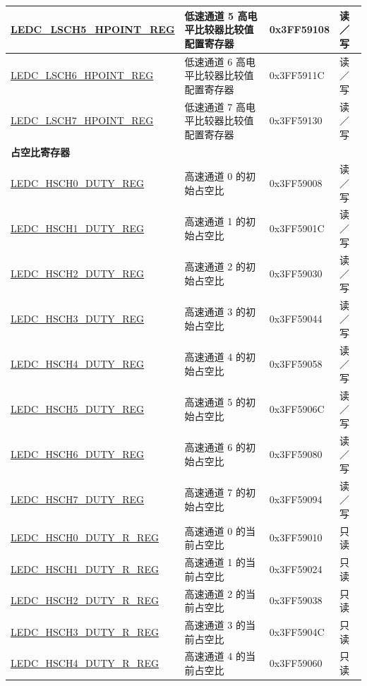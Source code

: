 \begin{longtable}{ | p{5cm} | p{7cm} | p{2.2cm} | p{1.2cm} | }
\hyperref[regdesc:LEDCLSCHnHPOINTREG]{LEDC\_LSCH5\_HPOINT\_REG} & 低速通道 5 高电平比较器比较值配置寄存器 & 0x3FF59108 & 读／写\\ \hline
\hyperref[regdesc:LEDCLSCHnHPOINTREG]{LEDC\_LSCH6\_HPOINT\_REG} & 低速通道 6 高电平比较器比较值配置寄存器 & 0x3FF5911C & 读／写\\ \hline
\hyperref[regdesc:LEDCLSCHnHPOINTREG]{LEDC\_LSCH7\_HPOINT\_REG} & 低速通道 7 高电平比较器比较值配置寄存器 & 0x3FF59130 & 读／写\\ \hline
\multicolumn{4}{|l|}{\textbf{占空比寄存器}} \\ \hline
\hyperref[regdesc:LEDCHSCHnDUTYREG]{LEDC\_HSCH0\_DUTY\_REG} & 高速通道 0 的初始占空比 & 0x3FF59008 & 读／写\\ \hline
\hyperref[regdesc:LEDCHSCHnDUTYREG]{LEDC\_HSCH1\_DUTY\_REG} & 高速通道 1 的初始占空比 & 0x3FF5901C & 读／写 \\ \hline
\hyperref[regdesc:LEDCHSCHnDUTYREG]{LEDC\_HSCH2\_DUTY\_REG} & 高速通道 2 的初始占空比 & 0x3FF59030 & 读／写 \\ \hline
\hyperref[regdesc:LEDCHSCHnDUTYREG]{LEDC\_HSCH3\_DUTY\_REG} & 高速通道 3 的初始占空比 & 0x3FF59044 & 读／写 \\ \hline
\hyperref[regdesc:LEDCHSCHnDUTYREG]{LEDC\_HSCH4\_DUTY\_REG} & 高速通道 4 的初始占空比 & 0x3FF59058 & 读／写 \\ \hline
\hyperref[regdesc:LEDCHSCHnDUTYREG]{LEDC\_HSCH5\_DUTY\_REG} & 高速通道 5 的初始占空比 & 0x3FF5906C & 读／写 \\ \hline
\hyperref[regdesc:LEDCHSCHnDUTYREG]{LEDC\_HSCH6\_DUTY\_REG} & 高速通道 6 的初始占空比 & 0x3FF59080 & 读／写 \\ \hline
\hyperref[regdesc:LEDCHSCHnDUTYREG]{LEDC\_HSCH7\_DUTY\_REG} & 高速通道 7 的初始占空比 & 0x3FF59094 & 读／写 \\ \hline
\hyperref[regdesc:LEDCHSCHnDUTYRREG]{LEDC\_HSCH0\_DUTY\_R\_REG} & 高速通道 0 的当前占空比 & 0x3FF59010 & 只读 \\ \hline
\hyperref[regdesc:LEDCHSCHnDUTYRREG]{LEDC\_HSCH1\_DUTY\_R\_REG} & 高速通道 1 的当前占空比 & 0x3FF59024 & 只读 \\ \hline
\hyperref[regdesc:LEDCHSCHnDUTYRREG]{LEDC\_HSCH2\_DUTY\_R\_REG} & 高速通道 2 的当前占空比 & 0x3FF59038 & 只读 \\ \hline
\hyperref[regdesc:LEDCHSCHnDUTYRREG]{LEDC\_HSCH3\_DUTY\_R\_REG} & 高速通道 3 的当前占空比 & 0x3FF5904C & 只读 \\ \hline
\hyperref[regdesc:LEDCHSCHnDUTYRREG]{LEDC\_HSCH4\_DUTY\_R\_REG} & 高速通道 4 的当前占空比 & 0x3FF59060 & 只读 \\ \hline

\end{longtable}
